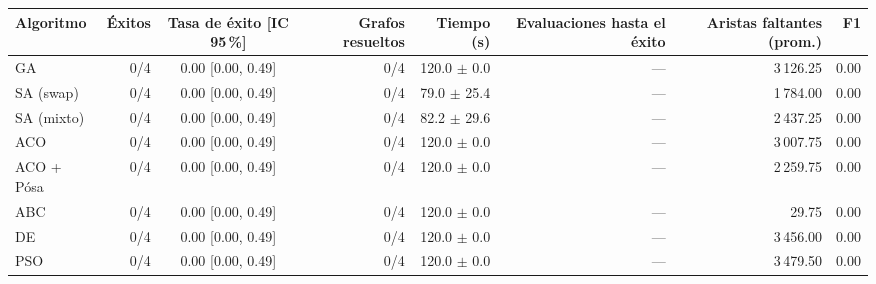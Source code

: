 \begin{tabular}{lrcrrrrr}
\toprule
Algoritmo & Éxitos & Tasa de éxito [IC 95\,\%] & Grafos resueltos & Tiempo (s) & Evaluaciones hasta el éxito & Aristas faltantes (prom.) & F1 \\
\midrule
GA & 0/4 & 0.00 [0.00, 0.49] & 0/4 & 120.0 $\pm$ 0.0 & --- & 3\,126.25 & 0.00 \\
SA (swap) & 0/4 & 0.00 [0.00, 0.49] & 0/4 & 79.0 $\pm$ 25.4 & --- & 1\,784.00 & 0.00 \\
SA (mixto) & 0/4 & 0.00 [0.00, 0.49] & 0/4 & 82.2 $\pm$ 29.6 & --- & 2\,437.25 & 0.00 \\
ACO & 0/4 & 0.00 [0.00, 0.49] & 0/4 & 120.0 $\pm$ 0.0 & --- & 3\,007.75 & 0.00 \\
ACO + Pósa & 0/4 & 0.00 [0.00, 0.49] & 0/4 & 120.0 $\pm$ 0.0 & --- & 2\,259.75 & 0.00 \\
ABC & 0/4 & 0.00 [0.00, 0.49] & 0/4 & 120.0 $\pm$ 0.0 & --- & 29.75 & 0.00 \\
DE & 0/4 & 0.00 [0.00, 0.49] & 0/4 & 120.0 $\pm$ 0.0 & --- & 3\,456.00 & 0.00 \\
PSO & 0/4 & 0.00 [0.00, 0.49] & 0/4 & 120.0 $\pm$ 0.0 & --- & 3\,479.50 & 0.00 \\
\bottomrule
\end{tabular}
